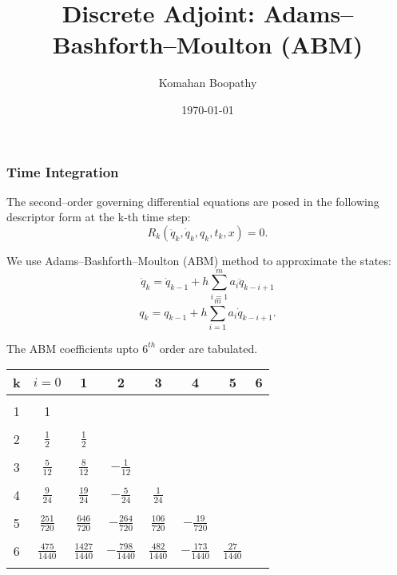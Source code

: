 \documentclass{beamer}
\title[\hspace{-0.2cm} DIRK Adjoint]
{
Discrete Adjoint: Adams--Bashforth--Moulton (ABM)
}
\author[Komahan Boopathy]
{
  \Large {Komahan Boopathy}\\
}
\institute
{
  \large Georgia Institute of Technology\\
 School of Aerospace Engineering\\
 Atlanta, GA
}
\date
{
\small \today
}
\begin{document}
\begin{frame}
  \titlepage
\end{frame}


\begin{frame}[allowframebreaks] \frametitle{Time Integration}

  The second--order governing differential equations are posed in the following
  descriptor form at the k-th time step:
  $$ R_k(\ddot{q}_k, \dot{q}_k, q_k, t_k , x) = 0.$$

  We use Adams--Bashforth--Moulton (ABM) method to approximate the states:
  $$ \dot{q}_k  = \dot{q}_{k-1}  + h \sum_{i=1}^{m} a_i \ddot{q}_{k-i+1}$$ 
  $$ {q}_k      =     {q}_{k-1}  + h \sum_{i=1}^{m} a_i \dot{q}_{k-i+1}.$$

  \framebreak

  The ABM coefficients upto $6^{th}$ order are tabulated.

  \begin{center}
    \begin{tabular}{cccccccc}
      \hline
      k & $i=0$ & 1 & 2 & 3 & 4 & 5 & 6 \\ 
      \hline
      &&&&&&&\\
      1 & 1     &   &   &   &   &   &  \\
      &&&&&&&\\
      2 & $\frac{1}{2}$ & $\frac{1}{2}$ &   &   &   &   &  \\
      &&&&&&&\\
      3 & $\frac{5}{12}$ & $\frac{8}{12}$ & $-\frac{1}{12}$  &   &   &   &  \\
      &&&&&&&\\
      4 & $\frac{9}{24}$ & $\frac{19}{24}$ & $-\frac{5}{24}$  & $\frac{1}{24}$  &   &   &  \\
      &&&&&&&\\
      5 & $\frac{251}{720}$ & $\frac{646}{720}$ & $-\frac{264}{720}$  & $\frac{106}{720}$  & $-\frac{19}{720}$  &   &  \\
      &&&&&&&\\
      6 & $\frac{475}{1440}$ & $\frac{1427}{1440}$ & $-\frac{798}{1440}$  & $\frac{482}{1440}$  & $-\frac{173}{1440}$  &  $\frac{27}{1440}$ &  \\
      &&&&&&&\\
      \hline   
    \end{tabular}
  \end{center}


\end{frame}
\end{document}
